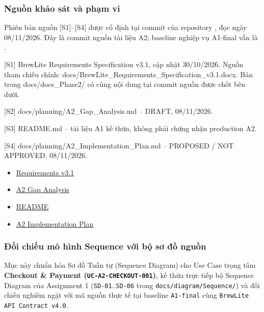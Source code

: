 \subsubsection{Nguồn khảo sát và phạm vi}

Phiên bản nguồn [S1]--[S4] được cố định tại commit  của repository , đọc ngày 08/11/2026. Đây là commit nguồn tài liệu A2; baseline nghiệp vụ A1-final vẫn là .
\par

[S1] BrewLite Requirements Specification v3.1, cập nhật 30/10/2026. Nguồn tham chiếu chính: docs/BrewLite\_Requirements\_Specification\_v3.1.docx. Bản trong docs/docs\_Phase2/ có cùng nội dung tại commit nguồn được chốt bên dưới.
\par

[S2] docs/planning/A2\_Gap\_Analysis.md -- DRAFT, 08/11/2026.
\par

[S3] README.md -- tài liệu A1 kế thừa, không phải chứng nhận production A2.
\par

[S4] docs/planning/A2\_Implementation\_Plan.md -- PROPOSED / NOT APPROVED, 08/11/2026.
\par

\begin{itemize}
\item \href{https://github.com/brewlite-project/brewlite-a2/blob/8b4224a907091529ca954c8b0792406cb8a0d9f2/docs/BrewLite_Requirements_Specification_v3.1.docx}{Requirements v3.1}
\item \href{https://github.com/brewlite-project/brewlite-a2/blob/8b4224a907091529ca954c8b0792406cb8a0d9f2/docs/planning/A2_Gap_Analysis.md}{A2 Gap Analysis}
\item \href{https://github.com/brewlite-project/brewlite-a2/blob/8b4224a907091529ca954c8b0792406cb8a0d9f2/README.md}{README}
\item \href{https://github.com/brewlite-project/brewlite-a2/blob/8b4224a907091529ca954c8b0792406cb8a0d9f2/docs/planning/A2_Implementation_Plan.md}{A2 Implementation Plan}
\end{itemize}

\subsubsection{Đối chiếu mô hình Sequence với bộ sơ đồ nguồn}
Mục này chuẩn hóa Sơ đồ Tuần tự (Sequence Diagram) cho Use Case trọng tâm \textbf{Checkout \& Payment (\texttt{UC-A2-CHECKOUT-001})}, kế thừa trực tiếp bộ Sequence Diagram của Assignment 1 (\texttt{SD-01}..\texttt{SD-06} trong \texttt{docs/diagram/Sequence/}) và đối chiếu nghiêm ngặt với mã nguồn thực tế tại baseline \texttt{A1-final} cùng \texttt{BrewLite API Contract v4.0}.

